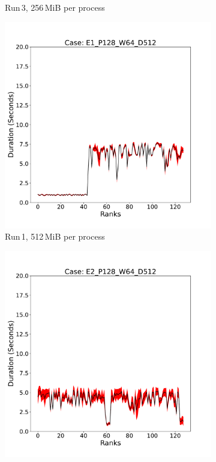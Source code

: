 \begin{figure}
\begin{subfigure}[b]{0.3\textwidth}
         \caption{Run\,3, 256\,MiB per process}
         \label{fig:E3_256_d2}
     \end{subfigure}
     \vfill
          \begin{subfigure}[b]{0.3\textwidth}
         \centering
         \includegraphics[width=\textwidth, height=\textwidth]{figures/deisa2__E1_P128_W64_D512.pdf}
         \caption{Run\,1, 512\,MiB per process}
         \label{fig:E1_512_d2}
     \end{subfigure}
     \hfill
     \begin{subfigure}[b]{0.3\textwidth}
         \centering
         \includegraphics[width=\textwidth, height=\textwidth]{figures/deisa2__E2_P128_W64_D512.pdf}

\end{subfigure}
\end{figure}
